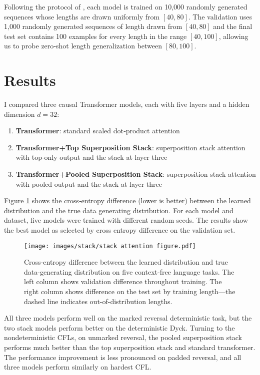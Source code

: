 Following the protocol of \citet{dusell2024stack}, each model is trained on 10,000 randomly generated sequences whose lengths are drawn uniformly from $[40,80]$. The validation uses 1,000 randomly generated sequences of length drawn from $[40,80]$ and the final test set contains 100 examples for every length in the range $[40,100]$, allowing us to probe zero‑shot length generalization between $[80,100]$.


\section{Results} \label{sec:stack-results}
I compared three causal Transformer models, each with five layers and a hidden dimension $d=32$:
\begin{enumerate}
    \item \textbf{Transformer}: standard scaled dot‑product attention
    \item \textbf{Transformer+Top Superposition Stack}: superposition stack attention with top‑only output and the stack at layer three
    \item \textbf{Transformer+Pooled Superposition Stack}: superposition stack attention with pooled output and the stack at layer three
\end{enumerate}

Figure \ref{fig:stack-results} shows the cross‑entropy difference (lower is better) between the learned distribution and the true data generating distribution. For each model and dataset, five models were trained with different random seeds. The results show the best model as selected by cross entropy difference on the validation set. 

\begin{figure}[h]
    \centering
    \vspace{-1em}
    \texttt{[image: images/stack/stack attention figure.pdf]}
    \caption{Cross-entropy difference between the learned distribution and true data-generating distribution on five context-free language tasks. The left column shows validation difference throughout training. The right column shows difference on the test set by training length—the dashed line indicates out-of-distribution lengths.}
    \label{fig:stack-results}
\end{figure}


All three models perform well on the marked reversal deterministic task, but the two stack models perform better on the deterministic Dyck. Turning to the nondeterministic CFLs, on unmarked reversal, the pooled superposition stack performs much better than the top superposition stack and standard transformer. The performance improvement is less pronounced on padded reversal, and all three models perform similarly on hardest CFL.


